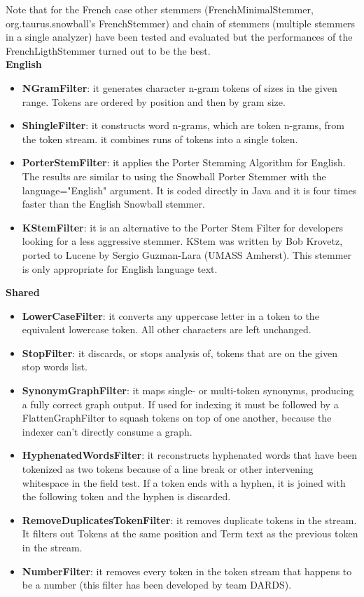 Note that for the French case other stemmers (FrenchMinimalStemmer, org.taurus.snowball's FrenchStemmer) and chain of stemmers (multiple stemmers in a single analyzer) have been tested and evaluated but the performances of the FrenchLigthStemmer turned out to be the best.
\\
\textbf{English}
\begin{itemize}
    \item \textbf{NGramFilter}: it generates character n-gram tokens of sizes in the given range. Tokens are ordered by position and then by gram size.
    \item \textbf{ShingleFilter}: it constructs word n-grams, which are token n-grams, from the token stream. it combines runs of tokens into a single token.
    \item \textbf{PorterStemFilter}: it applies the Porter Stemming Algorithm for English. The results are similar to using the Snowball Porter Stemmer with the language="English" argument. It is coded directly in Java and it is four times faster than the English Snowball stemmer.
    \item \textbf{KStemFilter}: it is an alternative to the Porter Stem Filter for developers looking for a less aggressive stemmer. KStem was written by Bob Krovetz, ported to Lucene by Sergio Guzman-Lara (UMASS Amherst). This stemmer is only appropriate for English language text.
\end{itemize}

\textbf{Shared}
\begin{itemize}
    \item \textbf{LowerCaseFilter}: it converts any uppercase letter in a token to the equivalent lowercase token. All other characters are left unchanged.
    \item \textbf{StopFilter}: it discards, or stops analysis of, tokens that are on the given stop words list.
    \item \textbf{SynonymGraphFilter}: it maps single- or multi-token synonyms, producing a fully correct graph output. If used for indexing it must be followed by a FlattenGraphFilter to squash tokens on top of one another, because the indexer can’t directly consume a graph.
    \item \textbf{HyphenatedWordsFilter}: it reconstructs hyphenated words that have been tokenized as two tokens because of a line break or other intervening whitespace in the field test. If a token ends with a hyphen, it is joined with the following token and the hyphen is discarded.
    \item \textbf{RemoveDuplicatesTokenFilter}: it removes duplicate tokens in the stream. It filters out Tokens at the same position and Term text as the previous token in the stream.

    \item \textbf{NumberFilter}: it removes every token in the token stream that happens to be a number (this filter has been developed by team DARDS).
\end{itemize}


